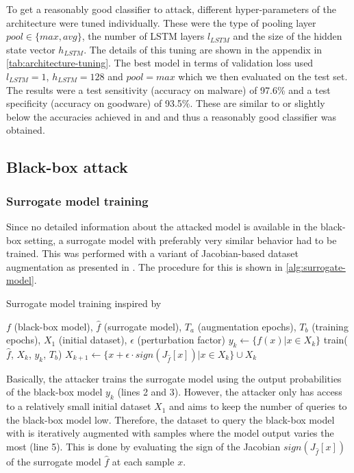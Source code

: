 \documentclass[final]{cvpr}
\begin{document}
To get a reasonably good classifier to attack, different hyper-parameters of 
the architecture were tuned individually. These were the type of pooling layer 
$pool \in \{max, avg\}$, the number of LSTM layers $l_{LSTM}$ and the size of 
the hidden state vector $h_{LSTM}$. The details of this tuning are shown in the 
appendix in \autoref{tab:architecture-tuning}. The best model in terms of 
validation loss used $l_{LSTM} = 1$, $h_{LSTM} = 128$ and 
$pool = max$ which we then evaluated on the test set. The results were a test 
sensitivity (accuracy on malware) of 97.6\% and a test specificity (accuracy on 
goodware) of 93.5\%. These are similar to or slightly below the accuracies 
achieved in \autocite[11]{DBLP:journals/corr/RosenbergSRE17} and 
\autocite[7]{agrawal2018robust} and thus a reasonably good classifier was 
obtained.

\subsection{Black-box attack}
\subsubsection{Surrogate model training}
\label{sec:surrogate-model-training}
Since no detailed information about the attacked model is available in the 
black-box setting, a surrogate model with preferably very similar behavior had 
to be trained. This was performed with a variant of Jacobian-based dataset 
augmentation as presented in \autocite[5-6]{DBLP:journals/corr/RosenbergSRE17}. 
The procedure for this is shown in \autoref{alg:surrogate-model}.

\begin{algorithm}
	\caption{Surrogate model training inspired by 
	\autocite[6]{DBLP:journals/corr/RosenbergSRE17}}
	\label{alg:surrogate-model}
	\begin{algorithmic}[1]
		\Require $f$ (black-box model), $\hat{f}$ (surrogate model), $T_a$ 
		(augmentation epochs), $T_b$ (training epochs), $X_1$ (initial 
		dataset), $\epsilon$ (perturbation factor)
			\State $y_k \gets \{f(x) | x \in X_k\}$
			\State train($\hat{f}$, $X_k$, $y_k$, $T_b$)
				\State $X_{k+1} \gets \{x + \epsilon \cdot sign(J_{\hat{f}}[x]) 
				| x \in X_k\} \cup X_k$
			\EndIf
		\EndFor
	\end{algorithmic}
\end{algorithm}

Basically, the attacker trains the surrogate model using the output 
probabilities of the 
black-box model $y_k$ (lines 2 and 3). However, the attacker only has access 
to a relatively small initial dataset $X_1$ and aims to keep the number of 
queries to the black-box model low. Therefore, the dataset to query the 
black-box model with is iteratively augmented with samples where the model 
output varies the most (line 5). This is done by evaluating the sign of the 
Jacobian $sign(J_{\hat{f}}[x])$ of the surrogate model $\hat{f}$ at each sample 
$x$. \autocite[5-6]{DBLP:journals/corr/RosenbergSRE17}
\end{document}
